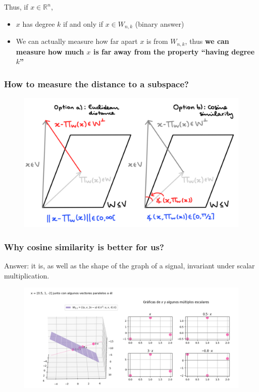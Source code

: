\documentclass[]{beamer}
\theoremstyle{definition}
\newcommand{\IR}{\mathbb{R}}
\begin{document}
\begin{frame}
Thus, if $x \in \IR^{n}$, 
\begin{itemize}
	\item $x$ has degree $k$ if and only if $x \in W_{n,k}$
	(binary answer)
	\item We can actually measure how far apart 
	$x$ is from $W_{n,k}$, thus \textbf{we can measure how much
	$x$ is far away from the property ``having degree $k$''}
\end{itemize}
\end{frame}

\begin{frame}
\frametitle{How to measure the distance to a subspace?}
\begin{figure}[h]
\includegraphics[scale = 0.9]{18Sept_1}
\end{figure}
\end{frame}

\begin{frame}
\frametitle{Why cosine similarity is better for us?}
Answer: it is, as well as the
shape of the graph of a signal, 
invariant under scalar multiplication.

\begin{figure}[h]
\includegraphics[scale = 0.15]{borrador}
\end{figure}
\end{frame}
\end{document}
